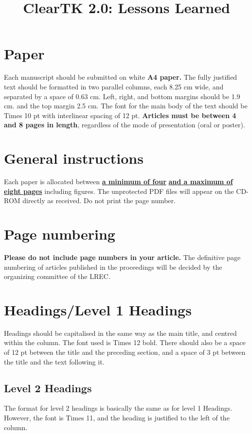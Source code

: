 \documentclass[10pt, a4paper]{article}
\title{ClearTK 2.0: Lessons Learned}
\begin{document}
\maketitleabstract

\section{Paper}
Each manuscript should be submitted on white \textbf{A4 paper.} The fully justified text should be formatted in two parallel columns, each 8.25 cm wide, and separated by a space of 0.63 cm. Left, right, and bottom margins should be 1.9 cm. and the top margin 2.5 cm. The font for the main body of the text should be Times 10 pt with interlinear spacing of 12 pt.
\textbf{Articles must be between 4 and 8 pages in length}, regardless of the mode of presentation (oral or poster).

\section{General instructions}

Each paper is allocated between \underline{\textbf{a mi\-ni\-mum of four}} \textbf{\underline{and a maximum of eight pages} } including figures. \newline The unprotected PDF files will appear on the CD-ROM directly as received. Do not print the page number.

\section{Page numbering}

\textbf{Please do not include page numbers in your article.} The definitive page numbering of articles published in the proceedings will be decided by the organizing committee of the LREC.

\section{Headings/Level 1 Headings}

Headings should be capitalised in the same way as the main title, and centred within the column. The font used is Times 12 bold. There should also be a space of 12 pt between the title and the preceding section, and a space of 3 pt between the title and the text following it.

\subsection{Level 2 Headings}

The format for level 2 headings is basically the same as for level 1 Headings. However, the font is Times 11, and the heading is justified to the left of the column.
\end{document}
